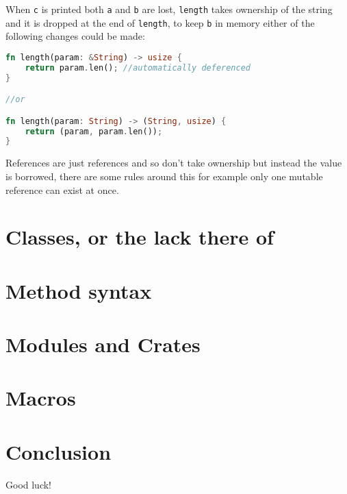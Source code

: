 \documentclass[a4paper,11pt]{article}
\begin{document}
When \lstinline{c} is printed both \lstinline{a} and \lstinline{b} are lost, \lstinline{length} takes ownership of the string and it is dropped at the end of \lstinline{length}, to keep \lstinline{b} in memory either of the following changes could be made:
\begin{lstlisting}[language=Rust,frame=single]
fn length(param: &String) -> usize {
	return param.len(); //automatically deferenced
}

//or

fn length(param: String) -> (String, usize) {
	return (param, param.len()); 
}
\end{lstlisting}

References are just references and so don't take ownership but instead the value is borrowed, there are some rules around this for example only one mutable reference can exist at once.

\newpage
\section{Classes, or the lack there of}


\newpage
\section{Method syntax}


\newpage
\section{Modules and Crates}

\newpage
\section{Macros}

\newpage
\section{Conclusion}
Good luck!
\end{document}
